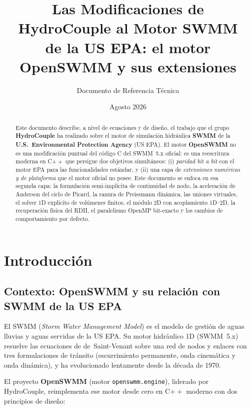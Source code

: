 \documentclass[11pt,a4paper]{article}
\title{\textbf{Las Modificaciones de HydroCouple al Motor SWMM}\\[0.6em]
\large de la US EPA: el motor OpenSWMM y sus extensiones}
\author{Documento de Referencia Técnica}
\date{Agosto 2026}
\begin{document}
\maketitle

\begin{abstract}
Este documento describe, a nivel de ecuaciones y de diseño, el trabajo que el
grupo \textbf{HydroCouple} ha realizado sobre el motor de simulación
hidráulica \textbf{SWMM} de la \textbf{U.S.\ Environmental Protection Agency}
(US EPA). El motor \textbf{OpenSWMM} no es una modificación puntual del código
C del SWMM~5.x oficial: es una reescritura moderna en C$++$ que persigue dos
objetivos simultáneos: (i) \emph{paridad bit a bit} con el motor EPA para las
funcionalidades estándar, y (ii) una capa de \emph{extensiones numéricas y de
plataforma} que el motor oficial no posee. Este documento se enfoca en esa
segunda capa: la formulación semi-implícita de continuidad de nodo, la
aceleración de Anderson del ciclo de Picard, la ranura de Preissmann dinámica,
las uniones virtuales, el solver 1D explícito de volúmenes finitos, el módulo
2D con acoplamiento 1D--2D, la recuperación física del RDII, el paralelismo
OpenMP bit-exacto y los cambios de comportamiento por defecto.
\end{abstract}

\tableofcontents
\newpage

\section{Introducción}

\subsection{Contexto: OpenSWMM y su relación con SWMM de la US EPA}

El SWMM (\emph{Storm Water Management Model}) es el modelo de gestión de aguas
lluvias y aguas servidas de la US EPA. Su motor hidráulico 1D (SWMM~5.x)
resuelve las ecuaciones de de~Saint-Venant sobre una red de nodos y enlaces con
tres formulaciones de tránsito (escurrimiento permanente, onda cinemática y
onda dinámica), y ha evolucionado lentamente desde la década de 1970.

El proyecto \textbf{OpenSWMM} (motor \texttt{openswmm.engine}), liderado por
HydroCouple, reimplementa ese motor desde cero en C$++$ moderno con dos
principios de diseño:
\end{document}
